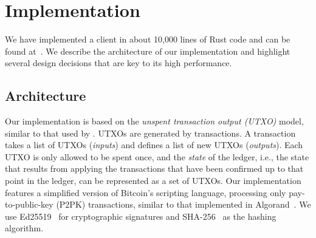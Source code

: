 \chapter{Implementation}
\label{sec:implementation}

We have implemented a \prism client in about 10,000 lines of Rust code and can be found at~\cite{prismcode}. We describe the architecture of our implementation and highlight several design decisions that are key to its high performance.

\label{sec:implementation-architecture}

\section{Architecture}


Our implementation is based on the \textit{unspent transaction output (UTXO)} model, similar to that used by \bitcoin. UTXOs are generated by transactions. A transaction takes a list of UTXOs (\textit{inputs}) and defines a list of new UTXOs (\textit{outputs}). Each UTXO is only allowed to be spent once, and the {\em state} of the ledger, i.e., the state that results from applying the transactions that have been confirmed up to that point in the ledger, can be represented as a set of UTXOs. Our implementation features a simplified version of Bitcoin's scripting language, processing only pay-to-public-key (P2PK) transactions, similar to that implemented in Algorand~\cite{algorand, algorandcode}. We use Ed25519~\cite{ed25519} for cryptographic signatures and SHA-256~\cite{sha256} as the hashing algorithm.

